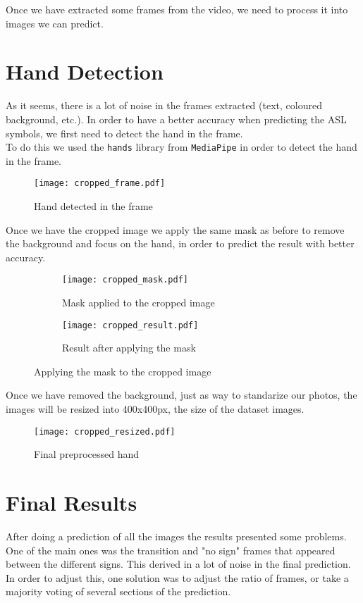 \documentclass[9pt,a4paper,twoside]{tau-class/tau}
\begin{document}
        Once we have extracted some frames from the video, we need to process it into images we can predict.
\section{Hand Detection}
	As it seems, there is a lot of noise in the frames extracted (text, coloured background, etc.). In order to have a better accuracy when predicting the ASL symbols, we first need to detect the hand in the frame.\\

    To do this we used the \verb|hands| library from \verb|MediaPipe| in order to detect the hand in the frame.
    \begin{figure}[H]
        \centering
        \texttt{[image: cropped\_frame.pdf]}
        \caption{Hand detected in the frame}
        \label{fig:crop_frame}
    \end{figure}

    Once we have the cropped image we apply the same mask as before to remove the background and focus on the hand, in order to predict the result with better accuracy.
    \begin{figure}[H]
        \centering
        \begin{subfigure}[b]{0.43\linewidth}
            \texttt{[image: cropped\_mask.pdf]}
            \caption{Mask applied to the cropped image}
            \label{fig:crop_mask}
        \end{subfigure}
        \hspace{2pt}
        \begin{subfigure}[b]{0.43\linewidth}
            \texttt{[image: cropped\_result.pdf]}
            \caption{Result after applying the mask}
            \label{fig:crop_res}
        \end{subfigure}
        \caption{Applying the mask to the cropped image}
    \end{figure}

    Once we have removed the background, just as way to standarize our photos, the images will be resized into 400x400px, the size of the dataset images.
    \begin{figure}[H]
        \centering
        \texttt{[image: cropped\_resized.pdf]}
        \caption{Final preprocessed hand}
    \end{figure}
\section{Final Results}
    After doing a prediction of all the images the results presented some problems. One of the main ones was the transition and "no sign" frames that appeared between the different signs.
    This derived in a lot of noise in the final prediction. In order to adjust this, one solution was to adjust the ratio of frames, or take a majority voting of several sections of the prediction.\\
\end{document}
